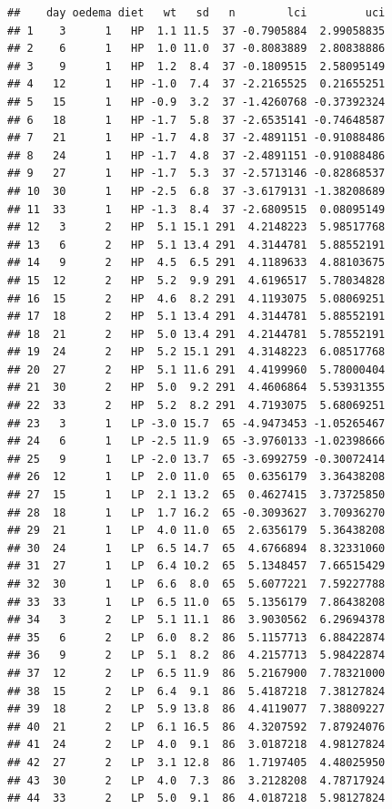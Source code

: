 \documentclass[12pt,]{book}
\theoremstyle{definition}
\theoremstyle{definition}
\theoremstyle{definition}
\theoremstyle{remark}
\begin{document}
\begin{verbatim}
##    day oedema diet   wt   sd   n        lci         uci
## 1    3      1   HP  1.1 11.5  37 -0.7905884  2.99058835
## 2    6      1   HP  1.0 11.0  37 -0.8083889  2.80838886
## 3    9      1   HP  1.2  8.4  37 -0.1809515  2.58095149
## 4   12      1   HP -1.0  7.4  37 -2.2165525  0.21655251
## 5   15      1   HP -0.9  3.2  37 -1.4260768 -0.37392324
## 6   18      1   HP -1.7  5.8  37 -2.6535141 -0.74648587
## 7   21      1   HP -1.7  4.8  37 -2.4891151 -0.91088486
## 8   24      1   HP -1.7  4.8  37 -2.4891151 -0.91088486
## 9   27      1   HP -1.7  5.3  37 -2.5713146 -0.82868537
## 10  30      1   HP -2.5  6.8  37 -3.6179131 -1.38208689
## 11  33      1   HP -1.3  8.4  37 -2.6809515  0.08095149
## 12   3      2   HP  5.1 15.1 291  4.2148223  5.98517768
## 13   6      2   HP  5.1 13.4 291  4.3144781  5.88552191
## 14   9      2   HP  4.5  6.5 291  4.1189633  4.88103675
## 15  12      2   HP  5.2  9.9 291  4.6196517  5.78034828
## 16  15      2   HP  4.6  8.2 291  4.1193075  5.08069251
## 17  18      2   HP  5.1 13.4 291  4.3144781  5.88552191
## 18  21      2   HP  5.0 13.4 291  4.2144781  5.78552191
## 19  24      2   HP  5.2 15.1 291  4.3148223  6.08517768
## 20  27      2   HP  5.1 11.6 291  4.4199960  5.78000404
## 21  30      2   HP  5.0  9.2 291  4.4606864  5.53931355
## 22  33      2   HP  5.2  8.2 291  4.7193075  5.68069251
## 23   3      1   LP -3.0 15.7  65 -4.9473453 -1.05265467
## 24   6      1   LP -2.5 11.9  65 -3.9760133 -1.02398666
## 25   9      1   LP -2.0 13.7  65 -3.6992759 -0.30072414
## 26  12      1   LP  2.0 11.0  65  0.6356179  3.36438208
## 27  15      1   LP  2.1 13.2  65  0.4627415  3.73725850
## 28  18      1   LP  1.7 16.2  65 -0.3093627  3.70936270
## 29  21      1   LP  4.0 11.0  65  2.6356179  5.36438208
## 30  24      1   LP  6.5 14.7  65  4.6766894  8.32331060
## 31  27      1   LP  6.4 10.2  65  5.1348457  7.66515429
## 32  30      1   LP  6.6  8.0  65  5.6077221  7.59227788
## 33  33      1   LP  6.5 11.0  65  5.1356179  7.86438208
## 34   3      2   LP  5.1 11.1  86  3.9030562  6.29694378
## 35   6      2   LP  6.0  8.2  86  5.1157713  6.88422874
## 36   9      2   LP  5.1  8.2  86  4.2157713  5.98422874
## 37  12      2   LP  6.5 11.9  86  5.2167900  7.78321000
## 38  15      2   LP  6.4  9.1  86  5.4187218  7.38127824
## 39  18      2   LP  5.9 13.8  86  4.4119077  7.38809227
## 40  21      2   LP  6.1 16.5  86  4.3207592  7.87924076
## 41  24      2   LP  4.0  9.1  86  3.0187218  4.98127824
## 42  27      2   LP  3.1 12.8  86  1.7197405  4.48025950
## 43  30      2   LP  4.0  7.3  86  3.2128208  4.78717924
## 44  33      2   LP  5.0  9.1  86  4.0187218  5.98127824
\end{verbatim}
\end{document}
